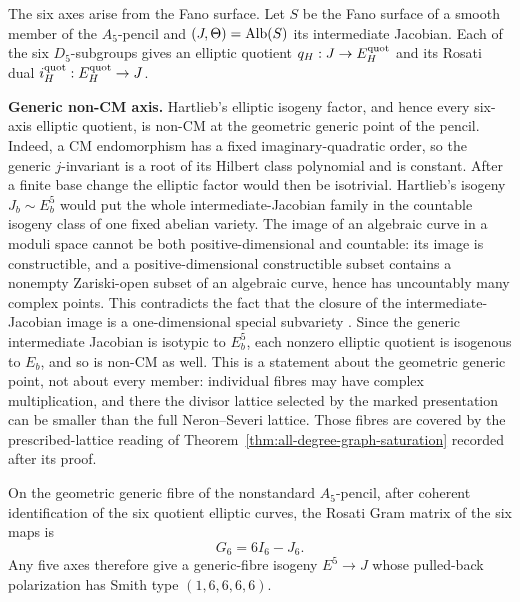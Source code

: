 The six axes arise from the Fano surface.  Let \(S\) be the
Fano surface of a smooth member of the \(A_5\)-pencil and
\((J,\Theta)=\operatorname{Alb}(S)\) its intermediate Jacobian.  Each of the six
\(D_5\)-subgroups gives an elliptic quotient \(q_H:J\to E_H^{\rm quot}\) and its Rosati
dual \(i_H^{\rm quot}:E_H^{\rm quot}\to J\).

\noindent\textbf{Generic non-CM axis.}
Hartlieb's elliptic isogeny factor, and hence every six-axis elliptic
quotient, is non-CM at the geometric generic point of the pencil.  Indeed, a
CM endomorphism has a fixed imaginary-quadratic order, so the generic
\(j\)-invariant is a root of its Hilbert class polynomial and is constant.
After a finite base change the elliptic factor would then be isotrivial.
Hartlieb's isogeny \(J_b\sim E_b^5\) would put the whole
intermediate-Jacobian family in the countable isogeny class of one fixed
abelian variety.  The image of an algebraic curve in a moduli space cannot be
both positive-dimensional and countable: its image is constructible, and a
positive-dimensional constructible subset contains a nonempty Zariski-open
subset of an algebraic curve, hence has uncountably many complex points.
This contradicts the fact that the closure of the intermediate-Jacobian
image is a one-dimensional special subvariety \cite[Proposition~5.7 and Remark~5.8]{Hartlieb}.  Since the generic
intermediate Jacobian is isotypic to \(E_b^5\), each nonzero elliptic quotient
is isogenous to \(E_b\), and so is non-CM as well.  This is a statement about
the geometric generic point, not about every member: individual fibres may
have complex multiplication, and there the divisor lattice selected by the
marked presentation can be smaller than the full Neron--Severi lattice.  Those
fibres are covered by the prescribed-lattice reading of
Theorem~\ref{thm:all-degree-graph-saturation} recorded after its proof.

\begin{proposition}
\label{prop:six-axis-polarization}
%
%
On the geometric generic fibre of the nonstandard $A_5$-pencil, after
coherent identification of the six quotient elliptic curves, the Rosati Gram
matrix of the six maps is
\[
 G_6=6I_6-J_6.
\]
Any five axes therefore give a generic-fibre isogeny \(E^5\to J\) whose
pulled-back polarization has Smith type \((1,6,6,6,6)\).
\end{proposition}

